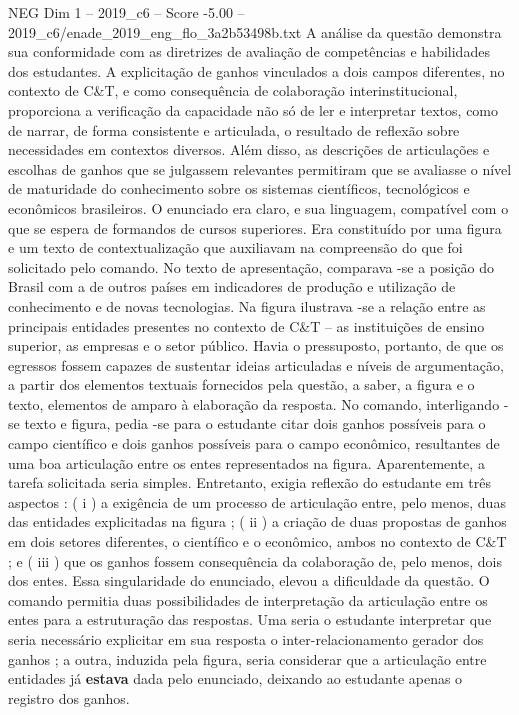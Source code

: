 \begin{textsample}{NEG Dim 1 – 2019\_c6 – Score -5.00 – 2019\_c6/enade\_2019\_eng\_flo\_3a2b53498b.txt}
A análise da questão demonstra sua conformidade com as diretrizes de avaliação de competências e habilidades dos estudantes.
A explicitação de ganhos vinculados a dois campos diferentes, no contexto de C\&T, e como consequência de colaboração interinstitucional, proporciona a verificação da capacidade não só de ler e interpretar textos, como de narrar, de forma consistente e articulada, o resultado de reflexão sobre necessidades em contextos diversos.
Além disso, as descrições de articulações e escolhas de ganhos que se julgassem relevantes permitiram que se avaliasse o nível de maturidade do conhecimento sobre os sistemas científicos, tecnológicos e econômicos brasileiros.
O enunciado era claro, e sua linguagem, compatível com o que se espera de formandos de cursos superiores.
Era constituído por uma figura e um texto de contextualização que auxiliavam na compreensão do que foi solicitado pelo comando.
No texto de apresentação, comparava -se a posição do Brasil com a de outros países em indicadores de produção e utilização de conhecimento e de novas tecnologias.
Na figura ilustrava -se a relação entre as principais entidades presentes no contexto de C\&T – as instituições de ensino superior, as empresas e o setor público.
Havia o pressuposto, portanto, de que os egressos fossem capazes de sustentar ideias articuladas e níveis de argumentação, a partir dos elementos textuais fornecidos pela questão, a saber, a figura e o texto, elementos de amparo à elaboração da resposta.
No comando, interligando -se texto e figura, pedia -se para o estudante citar dois ganhos possíveis para o campo científico e dois ganhos possíveis para o campo econômico, resultantes de uma boa articulação entre os entes representados na figura.
Aparentemente, a tarefa solicitada seria simples.
Entretanto, exigia reflexão do estudante em três aspectos : ( i ) a exigência de um processo de articulação entre, pelo menos, duas das entidades explicitadas na figura ; ( ii ) a criação de duas propostas de ganhos em dois setores diferentes, o científico e o econômico, ambos no contexto de C\&T ; e ( iii ) que os ganhos fossem consequência da colaboração de, pelo menos, dois dos entes.
Essa singularidade do enunciado, elevou a dificuldade da questão.
O comando permitia duas possibilidades de interpretação da articulação entre os entes para a estruturação das respostas.
Uma seria o estudante interpretar que seria necessário explicitar em sua resposta o inter-relacionamento gerador dos ganhos ; a outra, induzida pela figura, seria considerar que a articulação entre entidades já \textbf{estava} dada pelo enunciado, deixando ao estudante apenas o registro dos ganhos.

\end{textsample}
